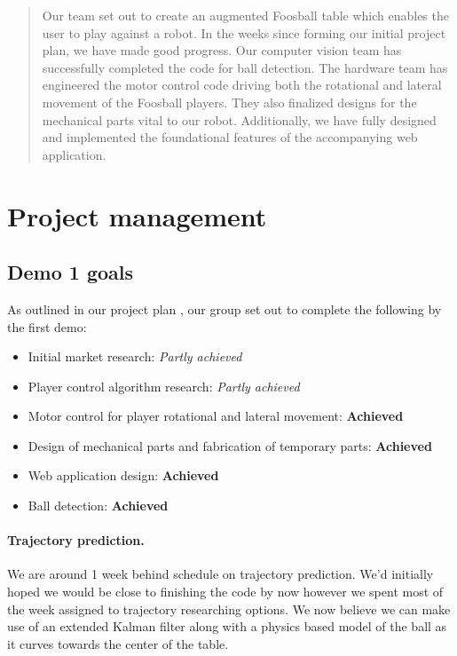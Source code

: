 \documentclass{article}
\begin{document}
 


\begin{abstract} 
Our team set out to create an augmented Foosball table which enables the user to play against a robot. In the weeks since forming our initial project plan, we have made good progress. Our computer vision team has successfully completed the code for ball detection. The hardware team has engineered the motor control code driving both the rotational and lateral movement of the Foosball players. They also finalized designs for the mechanical parts vital to our robot. Additionally, we have fully designed and implemented the foundational features of the accompanying web application.
\end{abstract} 

\section{Project management} 
\subsection{Demo 1 goals}
As outlined in our project plan \cite{}, our group set out to complete the following by the first demo:
\begin{itemize}
    \item Initial market research: \emph{Partly achieved}
    \item Player control algorithm research: \emph{Partly achieved}
    \item Motor control for player rotational and lateral movement: \textbf{Achieved}
    \item Design of mechanical parts and fabrication of temporary parts: \textbf{Achieved}
    \item Web application design: \textbf{Achieved}
    \item Ball detection: \textbf{Achieved}
\end{itemize}

\paragraph{Trajectory prediction.}
We are around 1 week behind schedule on trajectory prediction. We'd initially hoped we would be close to finishing the code by now however we spent most of the week assigned to trajectory researching options. We now believe we can make use of an extended Kalman filter\cite{kalman} along with a physics based model of the ball as it curves towards the center of the table.
\end{document}
